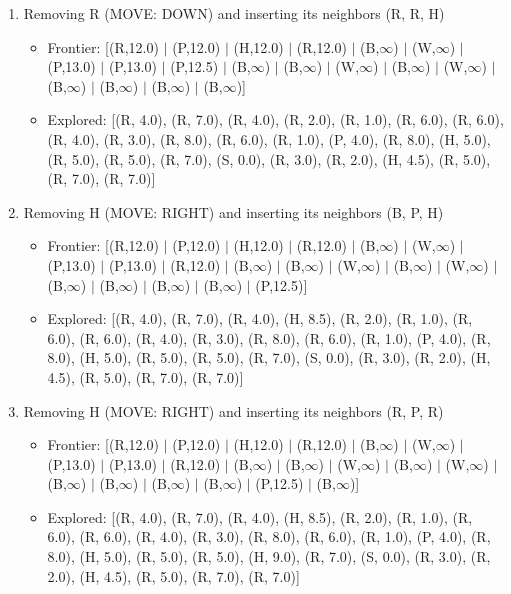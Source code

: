 \documentclass[12pt]{article}
\begin{document}
\begin{enumerate}
\item Removing R (MOVE: DOWN) and inserting its neighbors (R, R, H)
\begin{itemize}
\item Frontier: [(R,12.0) \(|\) (P,12.0) \(|\) (H,12.0) \(|\) (R,12.0) \(|\) (B,\(\infty\)) \(|\) (W,\(\infty\)) \(|\) (P,13.0) \(|\) (P,13.0) \(|\) (P,12.5) \(|\) (B,\(\infty\)) \(|\) (B,\(\infty\)) \(|\) (W,\(\infty\)) \(|\) (B,\(\infty\)) \(|\) (W,\(\infty\)) \(|\) (B,\(\infty\)) \(|\) (B,\(\infty\)) \(|\) (B,\(\infty\)) \(|\) (B,\(\infty\))]
\item Explored: [(R, 4.0), (R, 7.0), (R, 4.0), (R, 2.0), (R, 1.0), (R, 6.0), (R, 6.0), (R, 4.0), (R, 3.0), (R, 8.0), (R, 6.0), (R, 1.0), (P, 4.0), (R, 8.0), (H, 5.0), (R, 5.0), (R, 5.0), (R, 7.0), (S, 0.0), (R, 3.0), (R, 2.0), (H, 4.5), (R, 5.0), (R, 7.0), (R, 7.0)]
\end{itemize}

\item Removing H (MOVE: RIGHT) and inserting its neighbors (B, P, H)
\begin{itemize}
\item Frontier: [(R,12.0) \(|\) (P,12.0) \(|\) (H,12.0) \(|\) (R,12.0) \(|\) (B,\(\infty\)) \(|\) (W,\(\infty\)) \(|\) (P,13.0) \(|\) (P,13.0) \(|\) (R,12.0) \(|\) (B,\(\infty\)) \(|\) (B,\(\infty\)) \(|\) (W,\(\infty\)) \(|\) (B,\(\infty\)) \(|\) (W,\(\infty\)) \(|\) (B,\(\infty\)) \(|\) (B,\(\infty\)) \(|\) (B,\(\infty\)) \(|\) (B,\(\infty\)) \(|\) (P,12.5)]
\item Explored: [(R, 4.0), (R, 7.0), (R, 4.0), (H, 8.5), (R, 2.0), (R, 1.0), (R, 6.0), (R, 6.0), (R, 4.0), (R, 3.0), (R, 8.0), (R, 6.0), (R, 1.0), (P, 4.0), (R, 8.0), (H, 5.0), (R, 5.0), (R, 5.0), (R, 7.0), (S, 0.0), (R, 3.0), (R, 2.0), (H, 4.5), (R, 5.0), (R, 7.0), (R, 7.0)]
\end{itemize}

\item Removing H (MOVE: RIGHT) and inserting its neighbors (R, P, R)
\begin{itemize}
\item Frontier: [(R,12.0) \(|\) (P,12.0) \(|\) (H,12.0) \(|\) (R,12.0) \(|\) (B,\(\infty\)) \(|\) (W,\(\infty\)) \(|\) (P,13.0) \(|\) (P,13.0) \(|\) (R,12.0) \(|\) (B,\(\infty\)) \(|\) (B,\(\infty\)) \(|\) (W,\(\infty\)) \(|\) (B,\(\infty\)) \(|\) (W,\(\infty\)) \(|\) (B,\(\infty\)) \(|\) (B,\(\infty\)) \(|\) (B,\(\infty\)) \(|\) (B,\(\infty\)) \(|\) (P,12.5) \(|\) (B,\(\infty\))]
\item Explored: [(R, 4.0), (R, 7.0), (R, 4.0), (H, 8.5), (R, 2.0), (R, 1.0), (R, 6.0), (R, 6.0), (R, 4.0), (R, 3.0), (R, 8.0), (R, 6.0), (R, 1.0), (P, 4.0), (R, 8.0), (H, 5.0), (R, 5.0), (R, 5.0), (H, 9.0), (R, 7.0), (S, 0.0), (R, 3.0), (R, 2.0), (H, 4.5), (R, 5.0), (R, 7.0), (R, 7.0)]
\end{itemize}


\end{enumerate}
\end{document}
